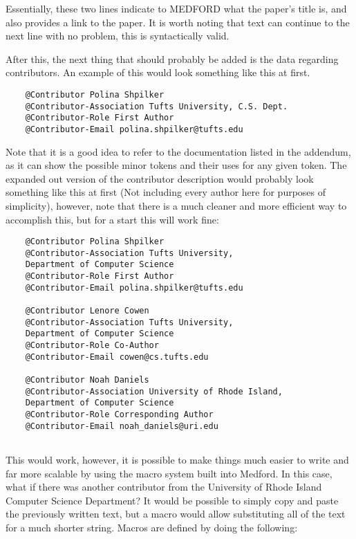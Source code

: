 \documentclass[]{article}%
\begin{document}
Essentially, these two lines indicate to MEDFORD what the paper's title is, and also provides a link to the paper. It is worth noting that text can continue to the next line with no problem, this is syntactically valid.

After this, the next thing that should probably be added is the data regarding contributors. An example of this would look something like this at first. 
\begin{small}
\begin{verbatim}
    @Contributor Polina Shpilker
    @Contributor-Association Tufts University, C.S. Dept.
    @Contributor-Role First Author
    @Contributor-Email polina.shpilker@tufts.edu
\end{verbatim}
\end{small}
Note that it is a good idea to refer to the documentation listed in the addendum, as it can show the possible minor tokens and their uses for any given token. The expanded out version of the contributor description would probably look something like this at first (Not including every author here for purposes of simplicity), however, note that there is a much cleaner and more efficient way to accomplish this, but for a start this will work fine:
\begin{small}
\begin{verbatim}
    @Contributor Polina Shpilker
    @Contributor-Association Tufts University,
    Department of Computer Science
    @Contributor-Role First Author
    @Contributor-Email polina.shpilker@tufts.edu
    
    @Contributor Lenore Cowen
    @Contributor-Association Tufts University,
    Department of Computer Science
    @Contributor-Role Co-Author
    @Contributor-Email cowen@cs.tufts.edu
    
    @Contributor Noah Daniels
    @Contributor-Association University of Rhode Island,
    Department of Computer Science
    @Contributor-Role Corresponding Author
    @Contributor-Email noah_daniels@uri.edu
    
\end{verbatim}
\end{small}
This would work, however,  it is possible to make things much easier to write and far more scalable by using the macro system built into Medford. In this case, what if there was another contributor from the University of Rhode Island Computer Science Department? It would be possible to simply copy and paste the previously written text, but a macro would allow substituting all of the text for a much shorter string. Macros are defined by doing the following:
\end{document}
